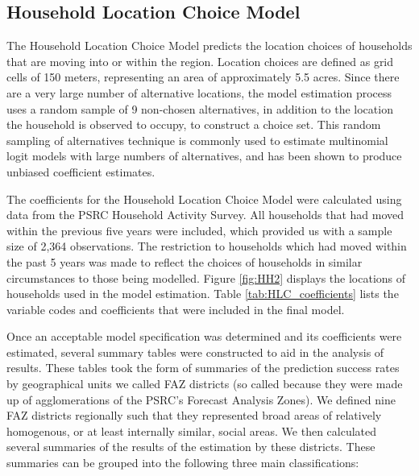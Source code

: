 \subsection{Household Location Choice Model}

The Household Location Choice Model predicts the location choices
of households that are moving into or within the region.  Location
choices are defined as grid cells of 150 meters, representing an
area of approximately 5.5 acres.  Since there are a very large
number of alternative locations, the model estimation process uses
a random sample of 9 non-chosen alternatives, in addition to the
location the household is observed to occupy, to construct a
choice set.  This random sampling of alternatives technique is
commonly used to estimate multinomial logit models with large
numbers of alternatives, and has been shown to produce unbiased
coefficient estimates.

The coefficients for the Household Location Choice Model were
calculated using data from the PSRC Household Activity Survey. All
households that had moved within the previous five years were
included, which provided us with a sample size of 2,364
observations.  The restriction to households which had moved
within the past 5 years was made to reflect the choices of
households in similar circumstances to those being modelled.
Figure \ref{fig:HH2} displays the locations of households used in
the model estimation. Table \ref{tab:HLC_coefficients} lists the
variable codes and coefficients that were included in the final
model.

Once an acceptable model specification was determined and its
coefficients were estimated, several summary tables were
constructed to aid in the analysis of results.  These tables took
the form of summaries of the prediction success rates by
geographical units we called FAZ districts (so called because they
were made up of agglomerations of the PSRC's Forecast Analysis
Zones).  We defined nine FAZ districts regionally such that they
represented broad areas of relatively homogenous, or at least
internally similar, social areas.  We then calculated several
summaries of the results of the estimation by these districts.
These summaries can be grouped into  the following three main
classifications:


